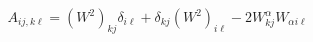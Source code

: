 \begin{equation}
A_{ij,k \ell} = (W^2)_{kj} \delta_{i\ell} + \delta_{kj} (W^2)_{i\ell} - 2
W^{\alpha}_{kj} W_{\alpha i\ell}
\label{an}
\end{equation}

